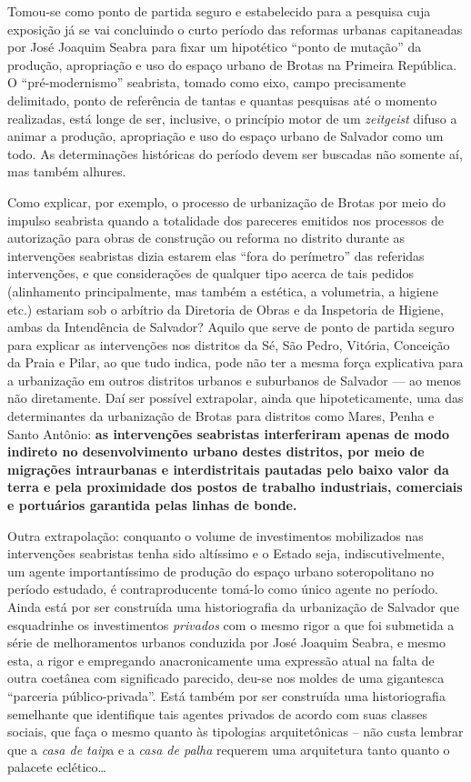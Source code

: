Tomou-se como ponto de partida seguro e estabelecido para a pesquisa cuja exposição já se vai concluindo o curto período das reformas urbanas capitaneadas por José Joaquim Seabra para fixar um hipotético ``ponto de mutação'' da produção, apropriação e uso do espaço urbano de Brotas na Primeira República. O ``pré-modernismo'' seabrista, tomado como eixo, campo precisamente delimitado, ponto de referência de tantas e quantas pesquisas até o momento realizadas, está longe de ser, inclusive, o princípio motor de um \textit{zeitgeist} difuso a animar a produção, apropriação e uso do espaço urbano de Salvador como um todo. As determinações históricas do período devem ser buscadas não somente aí, mas também alhures.

Como explicar, por exemplo, o processo de urbanização de Brotas por meio do impulso seabrista quando a totalidade dos pareceres emitidos nos processos de autorização para obras de construção ou reforma no distrito durante as intervenções seabristas dizia estarem elas ``fora do perímetro'' das referidas intervenções, e que considerações de qualquer tipo acerca de tais pedidos (alinhamento principalmente, mas também a estética, a volumetria, a higiene etc.) estariam sob o arbítrio da Diretoria de Obras e da Inspetoria de Higiene, ambas da Intendência de Salvador? Aquilo que serve de ponto de partida seguro para explicar as intervenções nos distritos da Sé, São Pedro, Vitória, Conceição da Praia e Pilar, ao que tudo indica, pode não ter a mesma força explicativa para a urbanização em outros distritos urbanos e suburbanos de Salvador --- ao menos não diretamente. Daí ser possível extrapolar, ainda que hipoteticamente, uma das determinantes da urbanização de Brotas para distritos como Mares, Penha e Santo Antônio: \textbf{as intervenções seabristas interferiram apenas de modo indireto no desenvolvimento urbano destes distritos, por meio de migrações intraurbanas e interdistritais pautadas pelo baixo valor da terra e pela proximidade dos postos de trabalho industriais, comerciais e portuários garantida pelas linhas de bonde.}

Outra extrapolação: conquanto o volume de investimentos mobilizados nas intervenções seabristas tenha sido altíssimo e o Estado seja, indiscutivelmente, um agente importantíssimo de produção do espaço urbano soteropolitano no período estudado, é contraproducente tomá-lo como único agente no período. Ainda está por ser construída uma historiografia da urbanização de Salvador que esquadrinhe os investimentos \textit{privados} com o mesmo rigor a que foi submetida a série de melhoramentos urbanos conduzida por José Joaquim Seabra, e mesmo esta, a rigor e empregando anacronicamente uma expressão atual na falta de outra coetânea com significado parecido, deu-se nos moldes de uma gigantesca ``parceria público-privada''. Está também por ser construída uma historiografia semelhante que identifique tais agentes privados de acordo com suas classes sociais, que faça o mesmo quanto às tipologias arquitetônicas – não custa lembrar que a \textit{casa de taip}a e a \textit{casa de palha} requerem uma arquitetura tanto quanto o palacete eclético\dots

